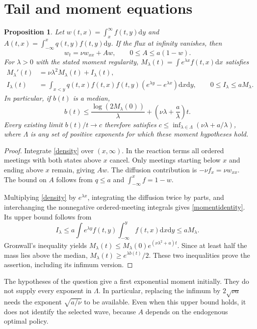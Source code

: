 \documentclass[11pt]{article}
\newtheorem{proposition}[theorem]{Proposition}
\newcommand{\dd}{\mathrm d}
\begin{document}
\section{Tail and moment equations}
\begin{proposition}\label{moment}
Let $w(t,x)=\int_x^\infty f(t,y)\dd y$ and $A(t,x)=\int_{-\infty}^x q(t,y)f(t,y)\dd y$. If the flux at infinity vanishes, then
\[
 w_t=\nu w_{xx}+Aw,\qquad 0\le A\le a(1-w).
\]
For $\lambda>0$ with the stated moment regularity, $M_\lambda(t)=\int e^{\lambda x}f(t,x)\dd x$ satisfies
\begin{align}\label{momentidentity}
 M_\lambda'(t)&=\nu\lambda^2 M_\lambda(t)+I_\lambda(t),\\
 I_\lambda(t)&=\int_{x<y}q(t,x)f(t,x)f(t,y)(e^{\lambda y}-e^{\lambda x})\dd x\dd y,
 \qquad 0\le I_\lambda\le aM_\lambda.\nonumber
\end{align}
In particular, if $b(t)$ is a median,
\[
 b(t)\le\frac{\log(2M_\lambda(0))}{\lambda}
       +\left(\nu\lambda+\frac a\lambda\right)t.
\]
Every existing limit $b(t)/t\to c$ therefore satisfies
$c\le\inf_{\lambda\in\Lambda}(\nu\lambda+a/\lambda)$,
where $\Lambda$ is any set of positive exponents for which these moment hypotheses hold.
\end{proposition}
\begin{proof}
Integrate \eqref{density} over $(x,\infty)$. In the reaction terms all ordered meetings with both states above $x$ cancel. Only meetings starting below $x$ and ending above $x$ remain, giving $Aw$. The diffusion contribution is $-\nu f_x=\nu w_{xx}$. The bound on $A$ follows from $q\le a$ and $\int_{-\infty}^x f=1-w$.

Multiplying \eqref{density} by $e^{\lambda x}$, integrating the diffusion twice by parts, and interchanging the nonnegative ordered-meeting integrals gives \eqref{momentidentity}. Its upper bound follows from
\[
 I_\lambda\le a\int e^{\lambda y}f(t,y)\int_{-\infty}^y f(t,x)\dd x\dd y\le aM_\lambda.
\]
Gronwall's inequality yields $M_\lambda(t)\le M_\lambda(0)e^{(\nu\lambda^2+a)t}$. Since at least half the mass lies above the median, $M_\lambda(t)\ge e^{\lambda b(t)}/2$. These two inequalities prove the assertion, including its infimum version.
\end{proof}

The hypotheses of the question give a first exponential moment initially. They do not supply every exponent in $\Lambda$. In particular, replacing the infimum by $2\sqrt{\nu a}$ needs the exponent $\sqrt{a/\nu}$ to be available. Even when this upper bound holds, it does not identify the selected wave, because $A$ depends on the endogenous optimal policy.
\end{document}
